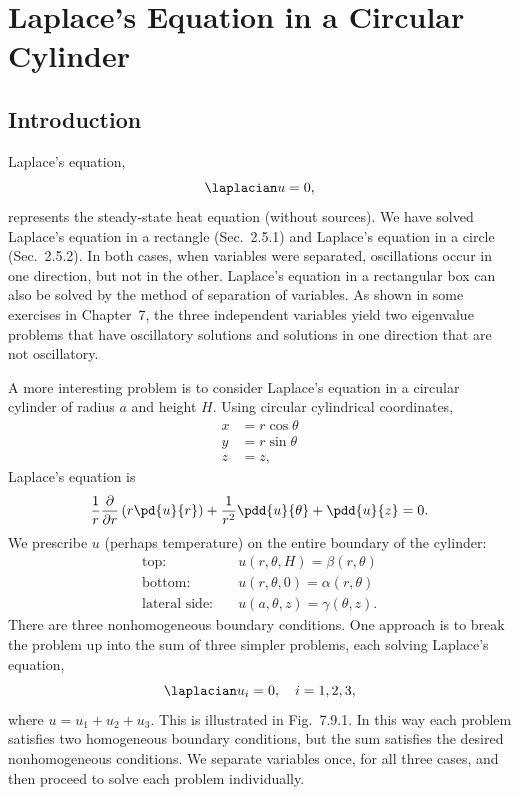 \section{Laplace's Equation in a Circular Cylinder}
\label{sec:7.9}

\subsection{Introduction}
\label{sec:7.9.1}

Laplace's equation,
\begin{equation}
\laplacian u = 0,
\label{eq:7.9.1}
\end{equation}
represents the steady-state heat equation (without sources).  We have solved Laplace's equation in a rectangle (Sec.~2.5.1) and Laplace's equation in a circle (Sec.~2.5.2).  In both cases, when variables were separated, oscillations occur in one direction, but not in the other.  Laplace's equation in a rectangular box can also be solved by the method of separation of variables.  As shown in some exercises in Chapter~7, the three independent variables yield two eigenvalue problems that have oscillatory solutions and solutions in one direction that are not oscillatory.

A more interesting problem is to consider Laplace's equation in a circular cylinder of radius $a$ and height $H$.  Using circular cylindrical coordinates,
\[
\begin{aligned}
x &= r\cos\theta \\
y &= r\sin\theta \\
z &= z,
\end{aligned}
\]
Laplace's equation is
\begin{equation}
\frac{1}{r}\frac{\partial}{\partial r}\left(r\pd{u}{r}\right) + \frac{1}{r^2}\pdd{u}{\theta} + \pdd{u}{z} = 0.
\label{eq:7.9.2}
\end{equation}
We prescribe $u$ (perhaps temperature) on the entire boundary of the cylinder:
\[
\begin{aligned}
\text{top:} &\quad u(r,\theta,H) = \beta(r,\theta) \\
\text{bottom:} &\quad u(r,\theta,0) = \alpha(r,\theta) \\
\text{lateral side:} &\quad u(a,\theta,z) = \gamma(\theta,z).
\end{aligned}
\]
There are three nonhomogeneous boundary conditions.  One approach is to break the problem up into the sum of three simpler problems, each solving Laplace's equation,
\[
\laplacian u_i = 0, \quad i = 1, 2, 3,
\]
where $u = u_1 + u_2 + u_3$.  This is illustrated in Fig.~7.9.1.  In this way each problem satisfies two homogeneous boundary conditions, but the sum satisfies the desired nonhomogeneous conditions.  We separate variables once, for all three cases, and then proceed to solve each problem individually.


